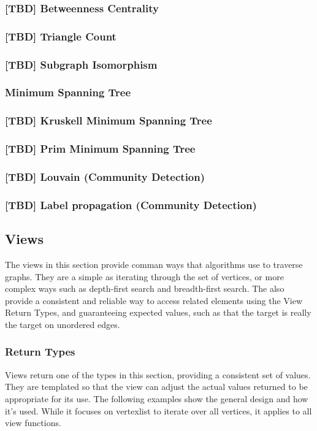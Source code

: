 \documentclass[10pt,onecolumn]{article}
\begin{document}
\subsubsection{[TBD] Betweenness Centrality}
\subsubsection{[TBD] Triangle Count}
\subsubsection{[TBD] Subgraph Isomorphism}
\subsubsection{Minimum Spanning Tree}
\subsubsection{[TBD] Kruskell Minimum Spanning Tree}
\subsubsection{[TBD] Prim Minimum Spanning Tree}
\subsubsection{[TBD] Louvain (Community Detection)}
\subsubsection{[TBD] Label propagation (Community Detection)}

\subsection{Views}
The views in this section provide comman ways that algorithms use to traverse graphs. They are a simple as iterating through the set of vertices, or more complex ways such as depth-first search and breadth-first search. The also provide a consistent and reliable way to access related elements using the View Return Types, and guaranteeing expected values, such as that the target is really the target on unordered edges.

\subsubsection{Return Types}
Views return one of the types in this section, providing a consistent set of values. They are templated so that the view can adjust the actual values returned to be appropriate for its use. The following examples show the general design and how it's used. While it focuses on vertexlist to iterate over all vertices, it applies to all view functions.
\end{document}
